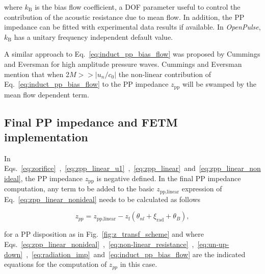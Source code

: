 \documentclass[12pt]{article}
\begin{document}
\noindent where $k_\text{B}$ is the bias flow coefficient, a \acrshort{DOF} parameter useful to control the contribution of the acoustic resistance due to mean flow. In addition, the \acrshort{PP} impedance can be fitted with experimental data results if available. In \textit{OpenPulse}, $k_\text{B}$ has a unitary frequency independent default value.

A similar approach to Eq.~\ref{eq:induct_pp_bias_flow} was proposed by Cummings and Eversman \cite{CUMMINGS1983503} for high amplitude pressure waves. Cummings and Eversman \cite{CUMMINGS1983503} mention that when 2$M >> |u_n/c_0|$ the non-linear contribution of Eq.~\ref{eq:induct_pp_bias_flow} to the \acrshort{PP} impedance $z_{\text{pp}}$ will be swamped by the mean flow dependent term.  


\subsection{Final PP impedance and FETM implementation}

In Eqs.~\ref{eq:zorifice}~,~\ref{eq:zpp_linear_u1}~,~\ref{eq:zpp_linear}~and~\ref{eq:zpp_linear_nonideal}, the \acrshort{PP} impedance  $z_{\text{pp}}$ is negative defined. In the final \acrshort{PP} impedance computation, any term to be added to the basic $z_{\text{pp,linear}}$ expression of Eq.~\ref{eq:zpp_linear_nonideal} needs to be calculated as follows

\begin{equation} \label{eq:zpp_final}
	z_{pp} = z_{\text{pp,linear}} -  z_{\text{f}} ( \theta_{nl} + \xi_{\text{rad}} + \theta_B ),
\end{equation}

\noindent for a \acrshort{PP} disposition as in Fig.~\ref{fig:z_transf_scheme} and where Eqs.~\ref{eq:zpp_linear_nonideal}~,~\ref{eq:non-linear_resistance}~,~\ref{eq:un-up-down}~,~\ref{eq:radiation_imp}~and~\ref{eq:induct_pp_bias_flow} are the indicated equations for the computation of $z_{pp}$ in this case. 
\end{document}
